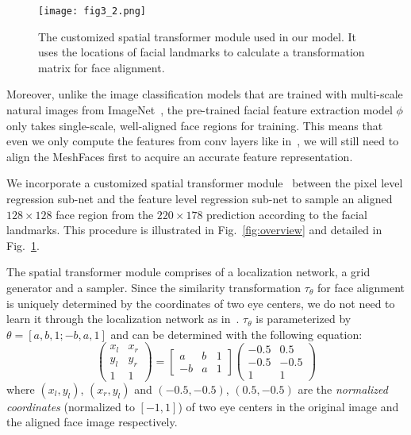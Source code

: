 \documentclass[10pt,twocolumn,letterpaper]{article}
\begin{document}
\begin{figure}
  \centering
    \texttt{[image: fig3\_2.png]}
    \caption{The customized spatial transformer module used in our model. It uses the locations of facial landmarks to calculate a transformation matrix for face alignment.}
    \label{fig:stn} %
\end{figure}

Moreover, unlike the image classification models that are trained with multi-scale natural images from ImageNet~\cite{russakovsky2015imagenet}, the pre-trained facial feature extraction model $\phi$ only takes single-scale, well-aligned face regions for training. This means that even we only compute the features from conv layers like in~\cite{guccluturk2016convolutional,johnson2016perceptual,LedigTHCATTWS16}, we will still need to align the MeshFaces first to acquire an accurate feature representation.





We incorporate a customized spatial transformer module~\cite{jaderberg2015spatial} between the pixel level regression sub-net and the feature level regression sub-net to sample an aligned $128 \times 128$ face region from the $220 \times 178$ prediction according to the facial landmarks. This procedure is illustrated in Fig.~\ref{fig:overview} and detailed in Fig.~\ref{fig:stn}.


The spatial transformer module comprises of a localization network, a grid generator and a sampler. Since the similarity transformation $\tau_\theta$ for face alignment is uniquely determined by the coordinates of two eye centers, we do not need to learn it through the localization network as in~\cite{jaderberg2015spatial}. $\tau_\theta$ is parameterized by $\theta = [a,b,1;-b,a,1]$ and can be determined with the following equation:
\begin{equation}
\left( {\begin{array}{*{20}{c}}
x_l&x_r\\
y_l&y_r\\
1&1
\end{array}} \right) = \left[{\begin{array}{*{20}{c}}
a&b&1\\
{ - b}&a&1
\end{array}} \right]\left({\begin{array}{*{20}{c}}
{ - 0.5}&{0.5}\\
{ - 0.5}&{ - 0.5}\\
1&1
\end{array}} \right)
\end{equation}
where $(x_l,y_l)$, $(x_r,y_l)$ and $(-0.5,-0.5)$, $(0.5,-0.5)$ are the \textit{normalized coordinates} (normalized to $[-1,1]$) of two eye centers in the original image and the aligned face image respectively.
\end{document}
